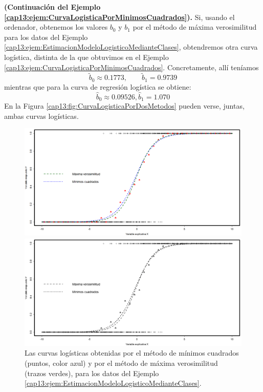 \begin{ejemplo}
\label{cap13:ejem:CurvaLogisticaPorDosMetodos}
{\bf (Continuación del Ejemplo \ref{cap13:ejem:CurvaLogisticaPorMinimosCuadrados}).}
Si, usando el ordenador, obtenemos los valores $b_0$ y $b_1$ por el método de máxima verosimilitud para los datos del Ejemplo \ref{cap13:ejem:EstimacionModeloLogisticoMedianteClases}, obtendremos otra curva logística, distinta de la que obtuvimos en el Ejemplo \ref{cap13:ejem:CurvaLogisticaPorMinimosCuadrados}. Concretamente, allí teníamos
\[\widetilde b_0\approx 0.1773,\qquad \widetilde b_1 = 0.9739\]
mientras que para la curva de regresión logística se obtiene:
\[
\hat b_0 \approx 0.09526, \hat b_1 = 1.070
\]
En la Figura \ref{cap13:fig:CurvaLogisticaPorDosMetodos} pueden verse, juntas, ambas curvas logísticas.

\begin{figure}[h!]
\begin{center}
\begin{enColor}
\includegraphics[width=13cm]{../fig/Cap13-CurvaLogisticaPorDosMetodos.png}
\end{enColor}
\begin{bn}
\includegraphics[width=13cm]{../fig/Cap13-CurvaLogisticaPorDosMetodos-bn.png}
\end{bn}
 \caption{Las curvas logísticas obtenidas por el método de mínimos cuadrados (puntos, color azul) y por el método de máxima verosimilitud (trazos verdes), para los datos del Ejemplo \ref{cap13:ejem:EstimacionModeloLogisticoMedianteClases}. }

\end{center}
\end{figure}
\end{ejemplo}
